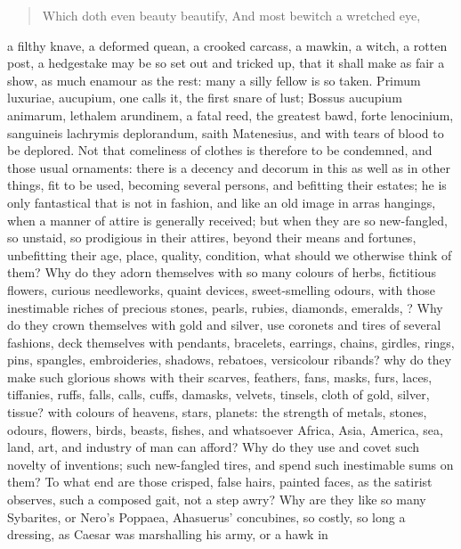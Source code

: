\begin{verse}%
Which doth even beauty beautify,
And most bewitch a wretched eye,
\end{verse}%

a filthy knave, a deformed quean, a crooked carcass, a mawkin, a witch,
a rotten post, a hedgestake may be so set out and tricked up, that it
shall make as fair a show, as much enamour as the rest: many a silly
fellow is so taken. Primum luxuriae, aucupium, one calls it, the first
snare of lust; Bossus aucupium animarum, lethalem arundinem, a
fatal reed, the greatest bawd, forte lenocinium, sanguineis lachrymis
deplorandum, saith Matenesius, and with tears of blood to be
deplored. Not that comeliness of clothes is therefore to be condemned,
and those usual ornaments: there is a decency and decorum in this as
well as in other things, fit to be used, becoming several persons, and
befitting their estates; he is only fantastical that is not in fashion,
and like an old image in arras hangings, when a manner of attire is
generally received; but when they are so new-fangled, so unstaid, so
prodigious in their attires, beyond their means and fortunes,
unbefitting their age, place, quality, condition, what should we
otherwise think of them? Why do they adorn themselves with so many
colours of herbs, fictitious flowers, curious needleworks, quaint
devices, sweet-smelling odours, with those inestimable riches of
precious stones, pearls, rubies, diamonds, emeralds, \etc{}? Why do they
crown themselves with gold and silver, use coronets and tires of
several fashions, deck themselves with pendants, bracelets, earrings,
chains, girdles, rings, pins, spangles, embroideries, shadows,
rebatoes, versicolour ribands? why do they make such glorious shows
with their scarves, feathers, fans, masks, furs, laces, tiffanies,
ruffs, falls, calls, cuffs, damasks, velvets, tinsels, cloth of gold,
silver, tissue? with colours of heavens, stars, planets: the strength
of metals, stones, odours, flowers, birds, beasts, fishes, and
whatsoever Africa, Asia, America, sea, land, art, and industry of man
can afford? Why do they use and covet such novelty of inventions; such
new-fangled tires, and spend such inestimable sums on them? To what end
are those crisped, false hairs, painted faces, as the satirist
observes, such a composed gait, not a step awry? Why are they like so
many Sybarites, or Nero's Poppaea, Ahasuerus' concubines, so costly, so
long a dressing, as Caesar was marshalling his army, or a hawk in
